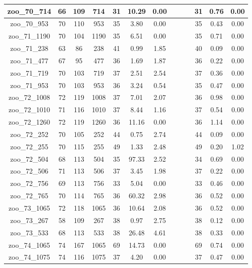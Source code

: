 \begin{landscape}
\begin{longtable}{|c|c|c|c|c|c|c|c|c|c|c|c|c|}
zoo\_70\_714 & 66 & 109 & 714 & 31 & 10.29 & 0.00 &  &  &  & 31 & 0.76 & 0.00 \\ \hline 
zoo\_70\_953 & 70 & 110 & 953 & 35 & 3.80 & 0.00 &  &  &  & 35 & 0.43 & 0.00 \\ \hline 
zoo\_71\_1190 & 70 & 104 & 1190 & 35 & 6.51 & 0.00 &  &  &  & 35 & 0.71 & 0.00 \\ \hline 
zoo\_71\_238 & 63 & 86 & 238 & 41 & 0.99 & 1.85 &  &  &  & 40 & 0.09 & 0.00 \\ \hline 
zoo\_71\_477 & 67 & 95 & 477 & 36 & 1.69 & 1.87 &  &  &  & 36 & 0.22 & 0.00 \\ \hline 
zoo\_71\_719 & 70 & 103 & 719 & 37 & 2.51 & 2.54 &  &  &  & 37 & 0.36 & 0.00 \\ \hline 
zoo\_71\_953 & 70 & 103 & 953 & 36 & 3.24 & 0.54 &  &  &  & 35 & 0.47 & 0.00 \\ \hline 
zoo\_72\_1008 & 72 & 119 & 1008 & 37 & 7.01 & 2.07 &  &  &  & 36 & 0.98 & 0.00 \\ \hline 
zoo\_72\_1010 & 71 & 116 & 1010 & 37 & 8.44 & 1.16 &  &  &  & 37 & 0.54 & 0.00 \\ \hline 
zoo\_72\_1260 & 72 & 119 & 1260 & 36 & 11.16 & 0.00 &  &  &  & 36 & 1.14 & 0.00 \\ \hline 
zoo\_72\_252 & 70 & 105 & 252 & 44 & 0.75 & 2.74 &  &  &  & 44 & 0.09 & 0.00 \\ \hline 
zoo\_72\_255 & 70 & 115 & 255 & 49 & 1.33 & 2.48 &  &  &  & 49 & 0.20 & 1.02 \\ \hline 
zoo\_72\_504 & 68 & 113 & 504 & 35 & 97.33 & 2.52 &  &  &  & 34 & 0.69 & 0.00 \\ \hline 
zoo\_72\_506 & 71 & 113 & 506 & 37 & 3.45 & 1.98 &  &  &  & 37 & 0.22 & 0.00 \\ \hline 
zoo\_72\_756 & 69 & 113 & 756 & 33 & 5.04 & 0.00 &  &  &  & 33 & 0.46 & 0.00 \\ \hline 
zoo\_72\_765 & 70 & 114 & 765 & 36 & 60.32 & 2.98 &  &  &  & 36 & 0.52 & 0.00 \\ \hline 
zoo\_73\_1065 & 72 & 118 & 1065 & 36 & 10.64 & 2.08 &  &  &  & 36 & 0.52 & 0.00 \\ \hline 
zoo\_73\_267 & 58 & 109 & 267 & 38 & 0.97 & 2.75 &  &  &  & 38 & 0.12 & 0.00 \\ \hline 
zoo\_73\_533 & 68 & 113 & 533 & 38 & 26.48 & 4.61 &  &  &  & 38 & 0.33 & 0.00 \\ \hline 
zoo\_74\_1065 & 74 & 167 & 1065 & 69 & 14.73 & 0.00 &  &  &  & 69 & 0.74 & 0.00 \\ \hline 
zoo\_74\_1075 & 74 & 116 & 1075 & 37 & 4.20 & 0.00 &  &  &  & 37 & 0.47 & 0.00 \\ \hline 

\end{longtable}
\end{landscape}
